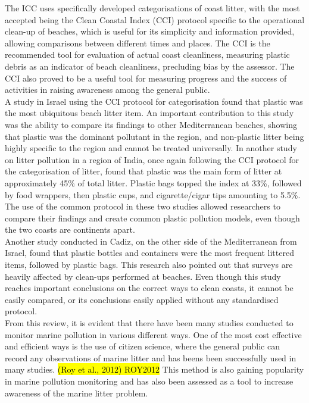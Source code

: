 \documentclass[10pt]{article}\usepackage[]{graphicx}\usepackage[]{color}
\begin{document}
The ICC uses specifically developed categorisations of coast litter, with the most accepted being the Clean Coastal Index (CCI) protocol specific to the operational clean-up of beaches, which is useful for its simplicity and information provided, allowing comparisons between different times and places. The CCI is the recommended tool for evaluation of actual coast cleanliness, measuring plastic debris as an indicator of beach cleanliness, precluding bias by the assessor. The CCI also proved to be a useful tool for measuring progress and the success of activities in raising awareness among the general public. \cite{ALKALAY2007} \\

A study in Israel using the CCI protocol for categorisation found that plastic was the most ubiquitous beach litter item. An important contribution to this study was the ability to compare its findings to other Mediterranean beaches, showing that plastic was the dominant pollutant in the region, and non-plastic litter being highly specific to the region and cannot be treated universally. \cite{PORTMAN2017} In another study on litter pollution in a region of India, once again following the CCI protocol for the categorisation of litter, found that plastic was the main form of litter at approximately 45\% of total litter. Plastic bags topped the index at 33\%, followed by food wrappers, then plastic cups, and cigarette/cigar tips amounting to 5.5\%. \cite{KUMAR2016} The use of the common protocol in these two studies allowed researchers to compare their findings and create common plastic pollution models, even though the two coasts are continents apart. \\

Another study conducted in Cadiz, on the other side of the Mediterranean from Israel, found that plastic bottles and containers were the most frequent littered items, followed by plastic bags. This research also pointed out that surveys are heavily affected by clean-ups performed at beaches. \cite{WILLIAMS2016} Even though this study reaches important conclusions on the correct ways to clean coasts, it cannot be easily compared, or its conclusions easily applied without any standardised protocol. \\

From this review, it is evident that there have been many studies conducted to monitor marine pollution in various different ways. One of the most cost effective and efficient ways is the use of citizen science, where the general public can record any observations of marine litter \cite{EARP2019} and has beens been successfully used in many studies. \hl{(Roy et al., 2012) ROY2012} \cite{FORRESTER2015} This method is also gaining popularity in marine pollution monitoring \cite{BRAVO2009} \cite{CARSON2012} \cite{HIDALGORUZ2017} \cite{BAUERCIVIELLO2018} and has also been assessed as a tool to increase awareness of the marine litter problem. \cite{LOCRITANI2019} \\
\end{document}
